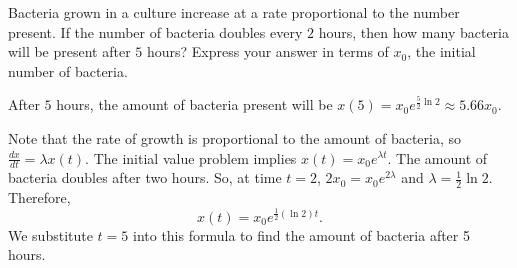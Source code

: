 \documentclass{ximera}
\begin{document}
\begin{exercise} \label{c3.1.3}
Bacteria grown in a culture increase at a rate proportional to the
number present.  If the number of bacteria doubles every $2$ hours,
then how many bacteria will be pre\-sent af\-ter $5$ hours?  Express
your answer in terms of $x_0$, the initial number of bacteria.

\begin{solution}

\ans After $5$ hours, the amount of bacteria present will be
$x(5) = x_0e^{\frac{5}{2} \ln 2} \approx 5.66x_0$.

\soln Note that the rate of growth is proportional to the amount of
bacteria, so $\frac{dx}{dt} = \lambda x(t)$.  The initial value problem
implies $x(t) = x_0e^{\lambda t}$.  The amount of bacteria doubles after
two hours.  So, at time $t = 2$, $2x_0 = x_0e^{2\lambda}$ and
$\lambda = \frac{1}{2} \ln 2$.  Therefore,
\[ x(t) = x_0e^{\frac{1}{2} (\ln 2)t}. \]
We substitute $t = 5$ into this formula to find the amount of
bacteria after 5 hours.

\end{solution}
\end{exercise}
\end{document}
